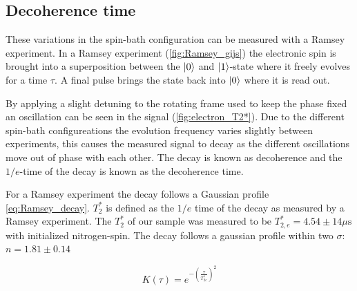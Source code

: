 \subsection{Decoherence time}
These variations in the spin-bath configuration can be measured with a Ramsey experiment.
In a Ramsey experiment (\cref{fig:Ramsey_gijs}) the electronic spin is brought into a superposition between the ${\left\vert{0}\right\rangle}$ and ${\left\vert{1}\right\rangle}$-state where it freely evolves for a time $\tau$.
A final pulse brings the state back into ${\left\vert{0}\right\rangle}$ where it is read out.

By applying a slight detuning to the rotating frame used to keep the phase fixed an oscillation can be seen in the signal (\cref{fig:electron_T2*}).
Due to the different spin-bath configureations the evolution frequency varies slightly between experiments, this causes the measured signal to decay as the different oscillations move out of phase with each other.
The decay is known as decoherence and the $1/e$-time of the decay is known as the decoherence time.

For a Ramsey experiment the decay follows a Gaussian profile \cref{eq:Ramsey_decay}.
$T_2^*$ is defined as the $1/e$ time of the decay as measured by a Ramsey experiment.
The $T_2^*$ of our sample was measured to be $T_{2,e}^* = 4.54 \pm 14 \mu\mathrm{s}$ with initialized nitrogen-spin.
The decay follows a gaussian profile within two $\sigma$: $n = 1.81 \pm 0.14$

\begin{equation}
    K(\tau) = e^{-(\tfrac{\tau}{T_{2e}^*})^2}
    \label{eq:Ramsey_decay}
\end{equation}

